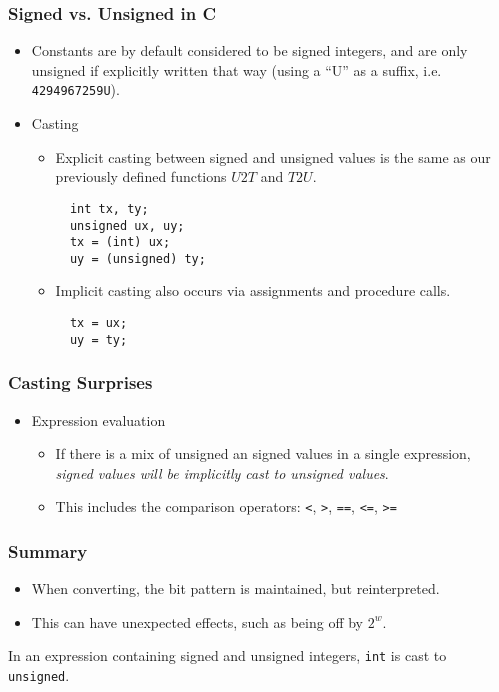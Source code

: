\documentclass[class=article, crop=false]{standalone}
\begin{document}
  \subsubsection{Signed vs. Unsigned in C}
  \begin{itemize}
    \item Constants are by default considered to be signed integers, and are only unsigned if explicitly written that way (using a ``U'' as a suffix, i.e. \texttt{4294967259U}).
    \item Casting
    \begin{itemize}
      \item Explicit casting between signed and unsigned values is the same as our previously defined functions $U2T$ and $T2U$.
      \begin{lstlisting}
  int tx, ty;
  unsigned ux, uy;
  tx = (int) ux;
  uy = (unsigned) ty;
      \end{lstlisting}
      \item Implicit casting also occurs via assignments and procedure calls.
      \begin{lstlisting}
  tx = ux;
  uy = ty;
      \end{lstlisting}
    \end{itemize}
  \end{itemize}
  \subsubsection{Casting Surprises}
  \begin{itemize}
    \item Expression evaluation
    \begin{itemize}
      \item If there is a mix of unsigned an signed values in a single expression, \emph{signed values will be implicitly cast to unsigned values}.
      \item This includes the comparison operators: \texttt{<}, \texttt{>}, \texttt{==}, \texttt{<=}, \texttt{>=}
    \end{itemize}
  \end{itemize}
  \subsubsection{Summary}
  \begin{itemize}
    \item When converting, the bit pattern is maintained, but reinterpreted.
    \item This can have unexpected effects, such as being off by $2^w$.
  \end{itemize}
  \begin{note}{}
    In an expression containing signed and unsigned integers, \texttt{int} is cast to \texttt{unsigned}.
  \end{note}
\end{document}
